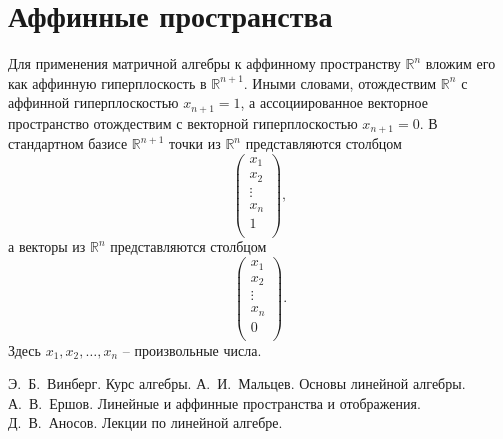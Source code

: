 \documentclass[a4paper]{article}
\begin{document}
\section{Аффинные пространства}
Для применения матричной алгебры к аффинному пространству $\mathbb R^n$ вложим его как аффинную гиперплоскость в $\mathbb R^{n+1}$. Иными словами, отождествим $\mathbb R^n$ с аффинной гиперплоскостью $x_{n+1} = 1$, а ассоциированное векторное пространство отождествим с векторной гиперплоскостью $x_{n+1} = 0$. В стандартном базисе $\mathbb R^{n+1}$ точки из $\mathbb R^n$ представляются столбцом 
$$
\left(
\begin{array}{c}
x_1 \\
x_2 \\
\vdots \\
x_n \\
1 \\
\end{array}
\right),
$$
а векторы из $\mathbb R^n$ представляются столбцом
$$
\left(
\begin{array}{c}
x_1 \\
x_2 \\
\vdots \\
x_n \\
0 \\
\end{array}
\right).
$$
Здесь $x_1, x_2, \dots, x_n$ -- произвольные числа.

\makeatletter
\renewcommand{\@biblabel}[1]{#1.\hfill}
\makeatother

\begin{thebibliography}{99}
Э.~Б.~Винберг. Курс алгебры.
А.~И.~Мальцев. Основы линейной алгебры.
А.~В.~Ершов. Линейные и аффинные пространства и отображения.
Д.~В.~Аносов. Лекции по линейной алгебре.
\end{thebibliography}
\end{document}
